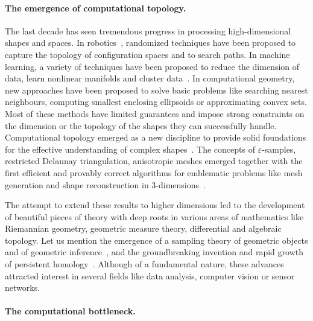 \paragraph{The emergence of computational topology.}
The last decade has seen tremendous progress in processing high-dimensional shapes and spaces. In robotics~\cite{sml-pa-2006}, randomized techniques have been proposed to capture the topology of configuration spaces and to search paths. In machine learning, a variety of techniques have been proposed to reduce the dimension of data, learn nonlinear manifolds and cluster data~\cite{hs-fmmds-2006}. In computational geometry, new approaches have been proposed to solve basic problems like searching nearest neighbours, computing smallest enclosing ellipsoids or approximating convex sets.
Most  of these methods have limited guarantees and 
impose strong constraints on the dimension or the topology of the shapes they can successfully handle. Computational topology emerged as a new discipline  to 
provide solid foundations for the effective understanding of complex shapes~\cite{hh-ct-2010}. 
The concepts of $\varepsilon$-samples, restricted Delaunay triangulation, anisotropic meshes emerged together with the first efficient and provably correct algorithms for emblematic problems like mesh generation and shape reconstruction in 3-dimensions~\cite{geometrica-ecg-book}. 

 The attempt to extend these results to higher dimensions led to the development of beautiful pieces of theory with deep roots in various areas of mathematics like Riemannian geometry, geometric measure theory, differential and algebraic topology. Let us mention  the emergence of a sampling theory of geometric objects and of geometric inference~\cite{geometrica-ccl09}, and the groundbreaking invention and rapid growth of persistent homology~\cite{eh-ph-2008}.
Although of a fundamental nature, these advances 
attracted  interest in several fields like data analysis, computer vision or sensor networks.

\paragraph{The computational bottleneck.}


